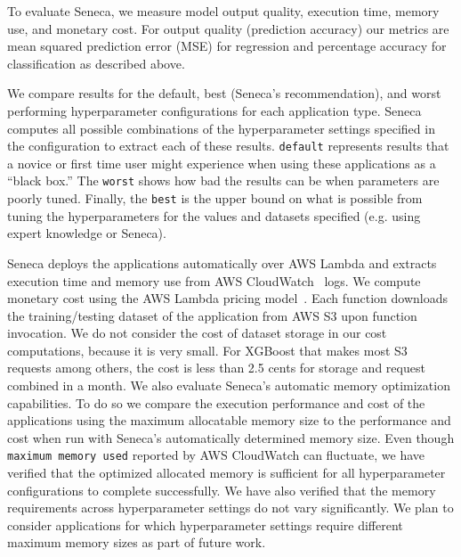 To evaluate Seneca, we measure model output quality, execution time, memory
use, and monetary cost.  For output quality (prediction accuracy) our metrics
are mean squared prediction error (MSE) for regression and percentage accuracy for
classification as described above. 


We compare results for the default, best (Seneca's recommendation), and worst performing hyperparameter configurations for each application type. Seneca computes all possible combinations of the hyperparameter settings specified in the configuration to extract each of these results.  \texttt{default} represents results that a novice or first time user might experience when using these applications as a ``black box.''  The \texttt{worst} shows how bad the results can be when parameters are poorly tuned.  Finally, the \texttt{best} is the upper bound on what is possible from tuning the hyperparameters for the values and datasets specified  (e.g. using expert knowledge or Seneca). 

Seneca deploys the applications automatically over AWS Lambda
and extracts execution time and memory use from 
AWS CloudWatch~\cite{ref:awscloudwatch} logs.
We compute monetary cost using the AWS Lambda pricing model~\cite{ref:pricing}.
Each function downloads the training/testing dataset 
of the application from AWS S3 upon function invocation. 
We do not consider the cost of dataset storage 
in our cost computations, because it is very small. For XGBoost that makes most S3 requests among others, the cost is less than 2.5 cents for storage and request combined in a month.
We also evaluate Seneca's automatic memory optimization capabilities.  To
do so we compare the execution performance and cost of the applications using
the maximum allocatable memory size to the performance and cost when run with
Seneca's automatically determined memory size. Even though \texttt{maximum memory used} reported by AWS CloudWatch can fluctuate, we 
have verified that the optimized allocated memory is sufficient for all 
hyperparameter configurations to complete successfully.  We have also verified
that the memory requirements across hyperparameter settings do not vary 
significantly. We plan to consider applications for which hyperparameter settings require
different maximum memory sizes as part of future work.


